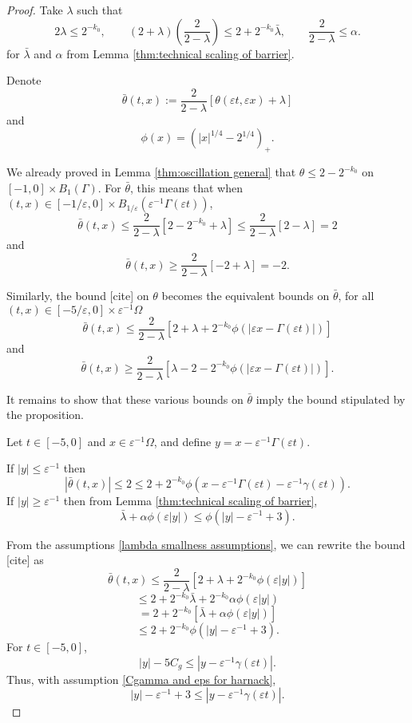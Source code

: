 \documentclass[11pt]{amsart}
\theoremstyle{remark}
\theoremstyle{definition}
\newcommand{\eps}{\varepsilon}
\newcommand{\paren}[1]{\left( #1 \right)}
\newcommand{\bracket}[1]{\left[ #1 \right]}
\newcommand{\abs}[1]{\left\lvert #1 \right\rvert}
\newcommand{\n}{^{-1}}
\newcommand{\Cgamma}{C_g}
\begin{document}
\begin{proof}
Take $\lambda$ such that
\begin{equation} \label{lambda smallness assumptions} 2\lambda \leq 2^{-k_0}, \qquad (2+\lambda)(\frac{2}{2-\lambda}) \leq 2 + 2^{-k_0} \bar{\lambda}, \qquad \frac{2}{2-\lambda} \leq \alpha. \end{equation}
for $\bar{\lambda}$ and $\alpha$ from Lemma \ref{thm:technical scaling of barrier}.  

Denote 
\[ \bar{\theta}(t,x) := \frac{2}{2-\lambda} \bracket{\theta(\eps t, \eps x) + \lambda} \]
and
\[ \phi(x) = \paren{|x|^{1/4} - 2^{1/4}}_+. \]

We already proved in Lemma \ref{thm:oscillation general} that $\theta \leq 2 - 2^{-k_0}$ on $[-1,0] \times B_1(\Gamma)$.  For $\bar{\theta}$, this means that when $(t,x) \in [-1/\eps, 0] \times B_{1/\eps}(\eps\n \Gamma(\eps t))$,
\[ \bar{\theta}(t,x) \leq \frac{2}{2-\lambda} \bracket{2-2^{-k_0}+\lambda} \leq \frac{2}{2-\lambda} \bracket{2-\lambda} = 2 \]
and
\[ \bar{\theta}(t,x) \geq \frac{2}{2-\lambda} \bracket{-2+\lambda} = -2. \]

Similarly, the bound [cite] on $\theta$ becomes the equivalent bounds on $\bar{\theta}$, for all $(t,x) \in [-5/\eps,0] \times \eps\n \Omega$
\[ \bar{\theta}(t,x) \leq \frac{2}{2-\lambda} \bracket{2 + \lambda + 2^{-k_0} \phi(|\eps x - \Gamma(\eps t)|)} \]
and
\[ \bar{\theta}(t,x) \geq \frac{2}{2-\lambda} \bracket{\lambda - 2 - 2^{-k_0} \phi(|\eps x - \Gamma(\eps t)|)}. \]

It remains to show that these various bounds on $\bar{\theta}$ imply the bound stipulated by the proposition.  

Let $t \in [-5,0]$ and $x \in \eps\n \Omega$, and define $y = x - \eps\n \Gamma(\eps t)$.  

If $|y| \leq \eps\n$ then
\[ \abs{\bar{\theta}(t,x)} \leq 2 \leq 2 + 2^{-k_0} \phi(x - \eps\n \Gamma(\eps t) - \eps\n \gamma(\eps t)). \]
If $|y| \geq \eps\n$ then from Lemma \ref{thm:technical scaling of barrier}, 
\[ \bar{\lambda} + \alpha \phi(\eps |y|) \leq \phi(|y| - \eps\n + 3). \]

From the assumptions \eqref{lambda smallness assumptions}, we can rewrite the bound [cite] as
\[ \bar{\theta}(t,x) \leq \frac{2}{2-\lambda} \bracket{2 + \lambda + 2^{-k_0} \phi(\eps |y|)} \]
\[ \leq 2 + 2^{-k_0} \bar{\lambda} + 2^{-k_0} \alpha \phi(\eps |y|) \]
\[ = 2 + 2^{-k_0} \bracket{\bar{\lambda} + \alpha \phi(\eps |y|)} \]
\[ \leq 2 + 2^{-k_0} \phi(|y| - \eps\n + 3). \]
For $t \in [-5,0]$,
\[ |y| - 5 \Cgamma \leq |y - \eps\n\gamma(\eps t)|. \]
Thus, with assumption \eqref{Cgamma and eps for harnack},
\[ |y| - \eps\n + 3 \leq |y-\eps\n\gamma(\eps t)|. \]


\end{proof}
\end{document}
